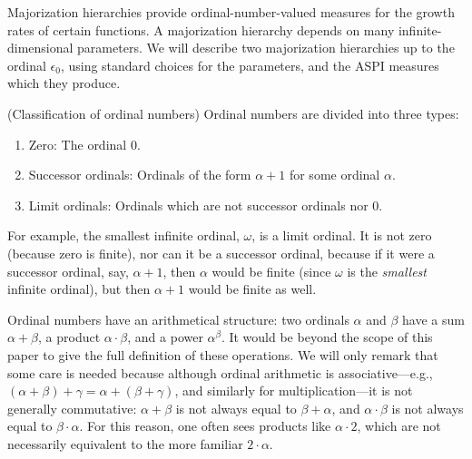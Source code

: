 \documentclass[twoside,11pt]{article}
\begin{document}
Majorization hierarchies \citep{weiermann2002slow}
provide ordinal-number-valued measures for the growth
rates of certain functions. A majorization hierarchy depends
on many infinite-dimensional parameters. We will describe two
majorization hierarchies up to the ordinal $\epsilon_0$,
using standard choices for the parameters, and the ASPI measures
which they produce.

\begin{definition}
    (Classification of ordinal numbers)
    Ordinal numbers are divided into three types:
    \begin{enumerate}
        \item Zero: The ordinal $0$.
        \item Successor ordinals: Ordinals of the form $\alpha+1$ for some ordinal $\alpha$.
        \item Limit ordinals: Ordinals which are not successor ordinals nor $0$.
    \end{enumerate}
\end{definition}

For example, the smallest infinite ordinal, $\omega$, is a limit ordinal. It is not zero
(because zero is finite),
nor can it be a successor ordinal, because if it were a successor ordinal, say, $\alpha+1$,
then $\alpha$ would be finite (since $\omega$ is the \emph{smallest} infinite ordinal),
but then $\alpha+1$ would be finite as well.

Ordinal numbers have an arithmetical structure: two ordinals $\alpha$ and $\beta$
have a sum $\alpha+\beta$, a product $\alpha\cdot \beta$, and a power
$\alpha^\beta$. It would be beyond the scope of this paper to give the full
definition of these operations. We will only remark that some care is needed because
although ordinal arithmetic is associative---e.g.,
$(\alpha+\beta)+\gamma=\alpha+(\beta+\gamma)$, and similarly for multiplication---it is
not generally commutative: $\alpha+\beta$ is not always equal to $\beta+\alpha$,
and $\alpha\cdot\beta$ is not always equal to $\beta\cdot\alpha$. For this reason,
one often sees products like $\alpha\cdot 2$, which are not necessarily equivalent to the
more familiar $2\cdot\alpha$.
\end{document}
